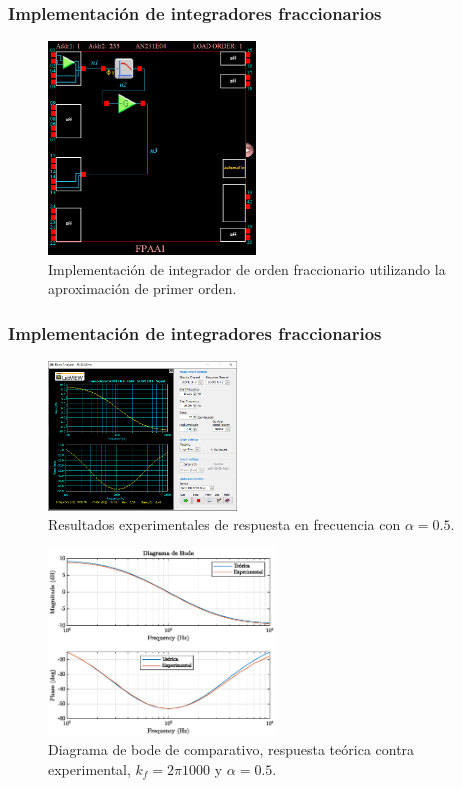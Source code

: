 \documentclass[10pt]{beamer}
\begin{document}
	\begin{frame}
		\frametitle{Implementación de integradores fraccionarios}
		\begin{figure}[!ht] 
		\caption{Implementación de integrador de orden fraccionario utilizando la aproximación de primer orden.}
		\label{fig:G4_AD2_BilinearFilter_implementation}
		\centering
		\includegraphics[width = 5.5cm]{../imagenes/G4_AD2_BilinearFilter_implementation.png}
	\end{figure}
	\end{frame}
	\begin{frame}
		\frametitle{Implementación de integradores fraccionarios}
		\begin{minipage}[t]{0.45\textwidth}
			\begin{figure}[!ht] 
		\caption{Resultados experimentales de respuesta en frecuencia con $\alpha = 0.5$.}
		\label{fig:M1_05}
		\centering
		\includegraphics[width = 5cm]{../imagenes/M1_05.png}
	\end{figure}
		\end{minipage} \hfill \begin{minipage}[t]{0.45\textwidth}
			\begin{figure}[hbtp]
		\caption{Diagrama de bode de comparativo, respuesta teórica contra experimental,  $k_{f} = 2\pi 1000$ y  $\alpha = 0.5$.} 
		\label{fig:V13_comparacion_exp}
		\centering
		\includegraphics[width=6cm]{../imagenes/V13_comparacion_exp.eps}
	\end{figure}
		\end{minipage}
	\end{frame}
\end{document}
